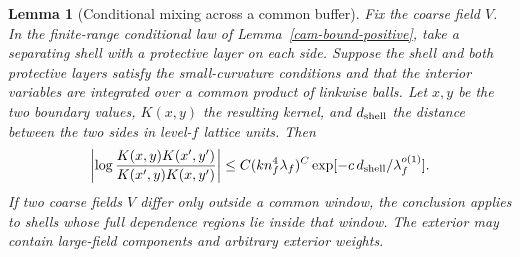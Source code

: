 \documentclass[11pt,a4paper]{article}
\newtheorem{lemma}[theorem]{Lemma}
\numberwithin{equation}{section}
\begin{document}
\begin{lemma}[Conditional mixing across a common buffer]\label{cam-bound-cross}
Fix the coarse field \(V\). In the finite-range conditional law of Lemma~\ref{cam-bound-positive}, take a separating shell with a protective layer on each side. Suppose the shell and both protective layers satisfy the small-curvature conditions and that the interior variables are integrated over a common product of linkwise balls. Let \(x,y\) be the two boundary values, \(K(x,y)\) the resulting kernel, and \(d_{\rm shell}\) the distance between the two sides in level-\(f\) lattice units. Then
\[
 \left|\log\frac{K(x,y)K(x',y')}{K(x',y)K(x,y')}\right|
 \le C(kn_f^4\lambda_f)^C
             \exp[-c\,d_{\rm shell}/\lambda_f^{o(1)}].
\]
If two coarse fields \(V\) differ only outside a common window, the conclusion applies to shells whose full dependence regions lie inside that window. The exterior may contain large-field components and arbitrary exterior weights.
\end{lemma}
\end{document}
